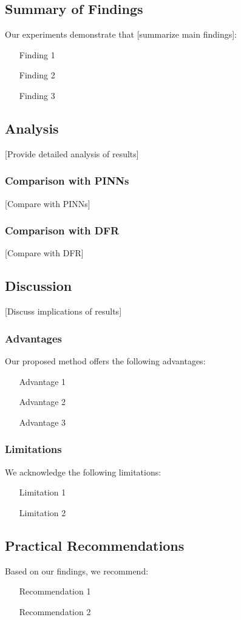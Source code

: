 
\subsection{Summary of Findings}

Our experiments demonstrate that [summarize main findings]:

\begin{enumerate}
    \item [Finding 1]
    \item [Finding 2]
    \item [Finding 3]
\end{enumerate}

\subsection{Analysis}

[Provide detailed analysis of results]

\subsubsection{Comparison with PINNs}

[Compare with PINNs]

\subsubsection{Comparison with DFR}

[Compare with DFR]

\subsection{Discussion}

[Discuss implications of results]

\subsubsection{Advantages}

Our proposed method offers the following advantages:
\begin{itemize}
    \item [Advantage 1]
    \item [Advantage 2]
    \item [Advantage 3]
\end{itemize}

\subsubsection{Limitations}

We acknowledge the following limitations:
\begin{itemize}
    \item [Limitation 1]
    \item [Limitation 2]
\end{itemize}

\subsection{Practical Recommendations}

Based on our findings, we recommend:
\begin{itemize}
    \item [Recommendation 1]
    \item [Recommendation 2]
\end{itemize}
